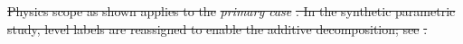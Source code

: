 \documentclass[a4paper,fleqn]{cas-sc} %
\renewcommand{\checkmark}{\ding{51}} %
\providecommand{\DIFdel}[1]{{\protect\color{red}\sout{#1}}} %
\providecommand{\DIFdelFL}[1]{\DIFdel{#1}} %
\providecommand{\DIFaddbeginFL}{} %
\providecommand{\DIFdelendFL}{} %
\providecommand{\Cref}[1]{\ref{#1}}
\begin{document}
\begin{table}[t]
\DIFdelFL{Physics scope as shown applies to the
    }\emph{\DIFdelFL{primary case}}%
\DIFdelFL{. In the synthetic parametric study, level labels are reassigned to enable the additive
    decomposition; see }%
\DIFdelFL{.
}%
\DIFdelendFL \DIFaddbeginFL \caption{The experimental contrasts. Within the four decomposition controls (topology
}
\end{table}
\end{document}
